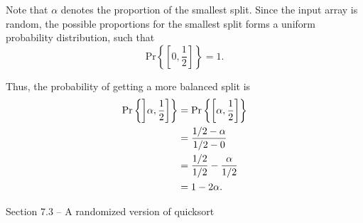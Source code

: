\begin{enumerate}
\begin{framed}
Note that $\alpha$ denotes the proportion of the smallest split. Since the input
array is random, the possible proportions for the smallest split forms a uniform
probability distribution, such that
\[
  \text{Pr}\left\{\left[0, \frac{1}{2}\right]\right\} = 1.
\]

Thus, the probability of getting a more balanced split is
\begin{equation*}
\begin{aligned}
  \text{Pr}\left\{\interval[open left, scaled]{\alpha}{\frac{1}{2}}\right\}
  &= \text{Pr}\left\{\interval[scaled]{\alpha}{\frac{1}{2}}\right\}\\
  &= \frac{1/2 - \alpha}{1/2 - 0}\\
  &= \frac{1/2}{1/2} - \frac{\alpha}{1/2}\\
  &= 1 - 2 \alpha.
\end{aligned}
\end{equation*}
\end{framed}

\end{enumerate}

\newpage

{\large Section 7.3 {--} A randomized version of quicksort}

